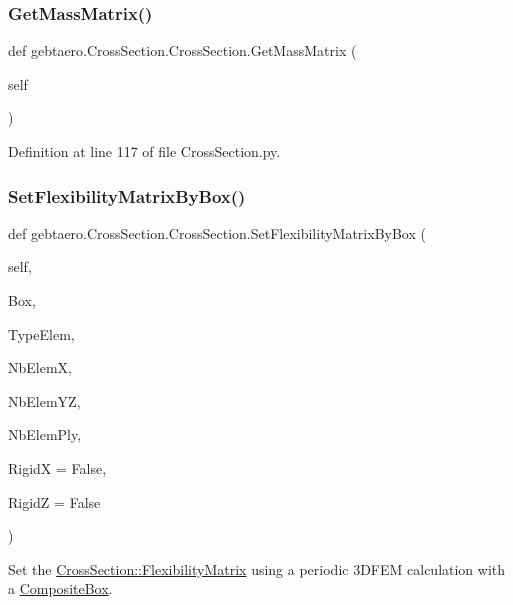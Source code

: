 \subsubsection{\texorpdfstring{Get\+Mass\+Matrix()}{GetMassMatrix()}}
{\footnotesize\ttfamily def gebtaero.\+Cross\+Section.\+Cross\+Section.\+Get\+Mass\+Matrix (\begin{DoxyParamCaption}\item[{}]{self }\end{DoxyParamCaption})}



Definition at line 117 of file Cross\+Section.\+py.

\mbox{\label{classgebtaero_1_1_cross_section_1_1_cross_section_ac316b6aa8955415debcc2f5dd6e28db6}} 
\subsubsection{\texorpdfstring{Set\+Flexibility\+Matrix\+By\+Box()}{SetFlexibilityMatrixByBox()}}
{\footnotesize\ttfamily def gebtaero.\+Cross\+Section.\+Cross\+Section.\+Set\+Flexibility\+Matrix\+By\+Box (\begin{DoxyParamCaption}\item[{}]{self,  }\item[{}]{Box,  }\item[{}]{Type\+Elem,  }\item[{}]{Nb\+ElemX,  }\item[{}]{Nb\+Elem\+YZ,  }\item[{}]{Nb\+Elem\+Ply,  }\item[{}]{RigidX = {\ttfamily False},  }\item[{}]{RigidZ = {\ttfamily False} }\end{DoxyParamCaption})}



Set the \hyperlink{classgebtaero_1_1_cross_section_1_1_cross_section_ac20eafaf38ff757f9a8c9ae89212396a}{Cross\+Section\+::\+Flexibility\+Matrix} using a periodic 3\+D\+F\+EM calculation with a \hyperlink{namespacegebtaero_1_1_composite_box}{Composite\+Box}. 


